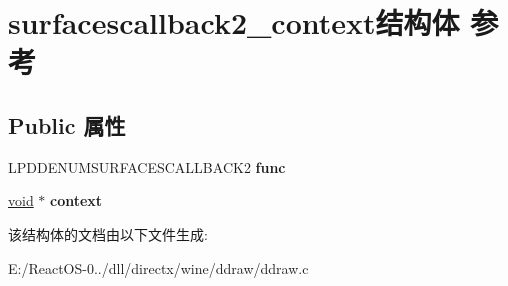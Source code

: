 \hypertarget{structsurfacescallback2__context}{}\section{surfacescallback2\+\_\+context结构体 参考}
\label{structsurfacescallback2__context}
\subsection*{Public 属性}
\begin{DoxyCompactItemize}
\item 
\mbox{\label{structsurfacescallback2__context_a63e56dba65780e7f131f6b6633d1bfda}} 
L\+P\+D\+D\+E\+N\+U\+M\+S\+U\+R\+F\+A\+C\+E\+S\+C\+A\+L\+L\+B\+A\+C\+K2 {\bfseries func}
\item 
\mbox{\label{structsurfacescallback2__context_a7f47d704637e93e884a8009fb2e31786}} 
\hyperlink{interfacevoid}{void} $\ast$ {\bfseries context}
\end{DoxyCompactItemize}


该结构体的文档由以下文件生成\+:\begin{DoxyCompactItemize}
\item 
E\+:/\+React\+O\+S-\/0../dll/directx/wine/ddraw/ddraw.\+c\end{DoxyCompactItemize}
